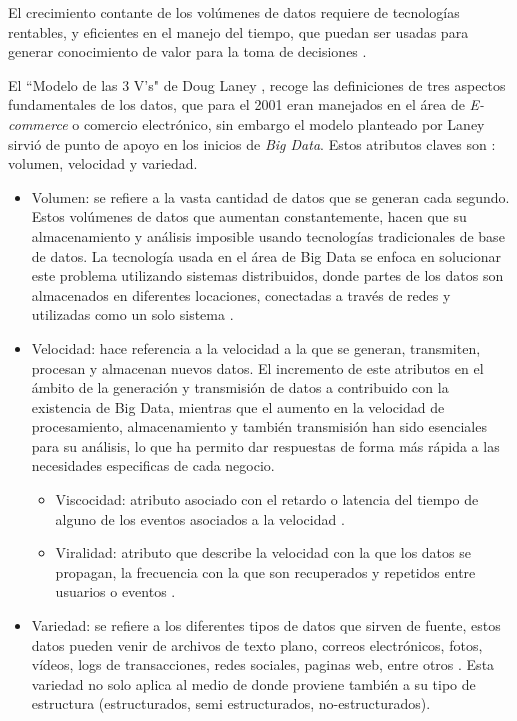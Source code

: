 El crecimiento contante de los volúmenes de datos requiere de tecnologías rentables, y eficientes en el manejo del tiempo, que puedan ser usadas para generar conocimiento de valor para la toma de decisiones \cite{8gartner,9ibm}.

 
El ``Modelo de las 3 V's" de Doug Laney \cite{10laney}, recoge las definiciones de tres aspectos fundamentales de los datos, que para el 2001 eran manejados en el área de \emph{E-commerce} o comercio electrónico, sin embargo el modelo planteado por Laney sirvió de punto de apoyo en los inicios de \emph{Big Data}. Estos atributos claves son : volumen, velocidad y variedad.

\begin{itemize}
\item Volumen:  se refiere a la vasta cantidad de datos que se generan cada segundo. Estos volúmenes de datos que aumentan constantemente, hacen que su almacenamiento y análisis imposible usando tecnologías tradicionales de base de datos. La tecnología usada en el área de Big Data se enfoca en solucionar este problema utilizando sistemas distribuidos, donde partes de los datos son almacenados en diferentes locaciones, conectadas a  través de redes y utilizadas como un solo sistema \cite{13bernard}.

\item Velocidad: hace referencia a la velocidad a la que se generan, transmiten, procesan y almacenan nuevos datos. El incremento de este atributos en el ámbito de la generación y transmisión de datos a contribuido con la existencia de Big Data, mientras que el aumento en la velocidad de procesamiento, almacenamiento y también transmisión han sido esenciales para su análisis, lo que ha permito dar respuestas de forma más rápida a las necesidades especificas de cada negocio\cite{11pragsis}. 

  \begin{itemize}
  \item Viscocidad: atributo asociado con el retardo o latencia del tiempo de alguno de los eventos asociados a la velocidad \cite{16}. 
  \item Viralidad: atributo que describe la velocidad con la que los datos se propagan, la frecuencia con la que son recuperados y repetidos entre usuarios o eventos \cite{16}.
  \end{itemize}
 \item Variedad: se refiere a los diferentes tipos de datos que sirven de fuente, estos datos pueden venir de archivos de texto plano, correos electrónicos, fotos, vídeos, logs de transacciones, redes sociales, paginas web, entre otros \cite{13bernard}. Esta variedad no solo aplica al medio de donde proviene también a su tipo de estructura (estructurados, semi estructurados, no-estructurados). 
 
\end{itemize}

